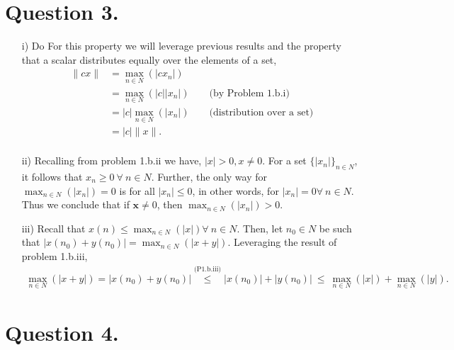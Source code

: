 \documentclass[12 pt,letterpaper]{article}
\begin{document}
\clearpage

\section*{Question 3.}

\begin{enumerate}
    \item[i)]
    Do For this property we will leverage previous results and the property that
    a scalar distributes equally over the elements of a set,
    \begin{align*}
        \|cx\|
        &= \max_{n\in N}(|cx_n|) \\
        &= \max_{n\in N}(|c||x_n|) \qquad \text{(by Problem 1.b.i)} \\
        &= |c|\max_{n\in N}(|x_n|) \qquad \text{(distribution over a set)} \\
        &= |c|\|x\|.\\
    \end{align*}
    \item[ii)]
    Recalling from problem 1.b.ii 
    we have, \(|x|>0, x\neq0\).
    For a set \(\{|x_n|\}_{n\in N}\),
    it follows that
    \(x_n \geq 0\ \forall\ n\in N\).
    Further, the only way for 
    \(\max_{n\in N}(|x_n|) = 0\)
    is for all \(|x_n|\leq0\),
    in other words, for \(|x_n|=0 \forall\ n\in N\).
    Thus we conclude that if \(\mathbf{x}\neq0\), then
    \(\max_{n\in N}(|x_n|)>0\).
    \item[iii)]
    Recall that \(x(n) \leq \max_{n\in N}(|x|)\forall\ n\in N\).
    Then, let \(n_0 \in N\) be such that \(|x(n_0) + y(n_0)| = \max_{n\in N}(|x+y|)\).
    Leveraging the result of problem 1.b.iii,
    \begin{align*}
        \max_{n\in N}(|x+y|) =
        |x(n_0) + y(n_0)| \overset{\text{(P1.b.iii)}}{\leq}
        |x(n_0)| + |y(n_0)| \ \leq\
        \max_{n\in N}(|x|) + \max_{n\in N}(|y|).
    \end{align*}
\end{enumerate}

\clearpage
\section*{Question 4.}
\end{document}
